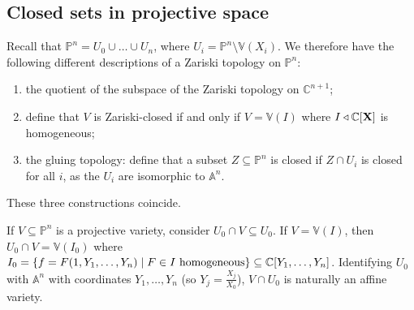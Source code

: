 \subsection{Closed sets in projective space}
Recall that \( \mathbb P^n = U_0 \cup \dots \cup U_n \), where \( U_i = \mathbb P^n \setminus \mathbb V(X_i) \).
We therefore have the following different descriptions of a Zariski topology on \( \mathbb P^n \):
\begin{enumerate}
    \item the quotient of the subspace of the Zariski topology on \( \mathbb C^{n+1} \);
    \item define that \( V \) is Zariski-closed if and only if \( V = \mathbb V(I) \) where \( I \triangleleft \mathbb C[\vb X] \) is homogeneous;
    \item the gluing topology: define that a subset \( Z \subseteq \mathbb P^n \) is closed if \( Z \cap U_i \) is closed for all \( i \), as the \( U_i \) are isomorphic to \( \mathbb A^n \).
\end{enumerate}
These three constructions coincide.

If \( V \subseteq \mathbb P^n \) is a projective variety, consider \( U_0 \cap V \subseteq U_0 \).
If \( V = \mathbb V(I) \), then \( U_0 \cap V = \mathbb V(I_0) \) where \( I_0 = \qty{f = F(1, Y_1, \dots, Y_n) \mid F \in I \text{ homogeneous}} \subseteq \mathbb C[Y_1, \dots, Y_n] \).
Identifying \( U_0 \) with \( \mathbb A^n \) with coordinates \( Y_1, \dots, Y_n \) (so \( Y_j = \frac{X_j}{X_0} \)), \( V \cap U_0 \) is naturally an affine variety.

